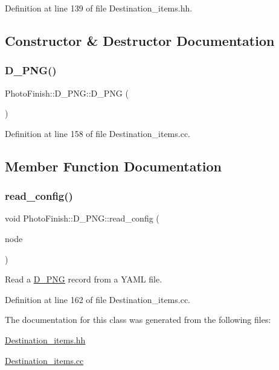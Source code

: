 Definition at line 139 of file Destination\+\_\+items.\+hh.



\subsection{Constructor \& Destructor Documentation}
\mbox{\label{class_photo_finish_1_1_d___p_n_g_acaefeb530af1932e10a17f99de4f3091}} 
\subsubsection{\texorpdfstring{D\+\_\+\+P\+N\+G()}{D\_PNG()}}
{\footnotesize\ttfamily Photo\+Finish\+::\+D\+\_\+\+P\+N\+G\+::\+D\+\_\+\+P\+NG (\begin{DoxyParamCaption}{ }\end{DoxyParamCaption})}



Definition at line 158 of file Destination\+\_\+items.\+cc.



\subsection{Member Function Documentation}
\mbox{\label{class_photo_finish_1_1_d___p_n_g_ad1db13836f032b95d5b0a3d63aa95d81}} 
\subsubsection{\texorpdfstring{read\+\_\+config()}{read\_config()}}
{\footnotesize\ttfamily void Photo\+Finish\+::\+D\+\_\+\+P\+N\+G\+::read\+\_\+config (\begin{DoxyParamCaption}\item[{const Y\+A\+M\+L\+::\+Node \&}]{node }\end{DoxyParamCaption})}



Read a \hyperlink{class_photo_finish_1_1_d___p_n_g}{D\+\_\+\+P\+NG} record from a Y\+A\+ML file. 



Definition at line 162 of file Destination\+\_\+items.\+cc.



The documentation for this class was generated from the following files\+:\begin{DoxyCompactItemize}
\item 
\hyperlink{_destination__items_8hh}{Destination\+\_\+items.\+hh}\item 
\hyperlink{_destination__items_8cc}{Destination\+\_\+items.\+cc}\end{DoxyCompactItemize}

